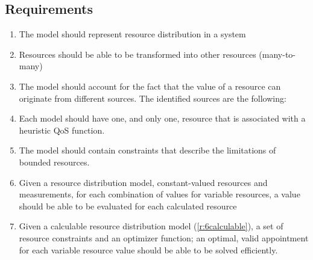 \subsection{Requirements}
\begin{enumerate}[label=R\rdmid .\arabic*]
\nospace
\item \label{r:1main} The model should represent resource distribution in a system
\item \label{r:2transform} Resources should be able to be transformed into other resources (many-to-many)
\item \label{r:3resource_types} The model should account for the fact that the value of a resource can originate from different sources. The identified sources are the following:
\item \label{r:4optimizer} Each model should have one, and only one, resource that is associated with a heuristic QoS function.
\item \label{r:5constraint} The model should contain constraints that describe the limitations of bounded resources.
\item \label{r:6calculable}Given a resource distribution model, constant-valued resources and measurements, for each combination of values for variable resources, a value should be able to be evaluated for each calculated resource
\item \label{r:7solvable} Given a calculable  resource distribution model (\ref{r:6calculable}), a set of resource constraints and an optimizer function; an optimal, valid appointment for each variable resource value should be able to be solved efficiently.
\end{enumerate}


